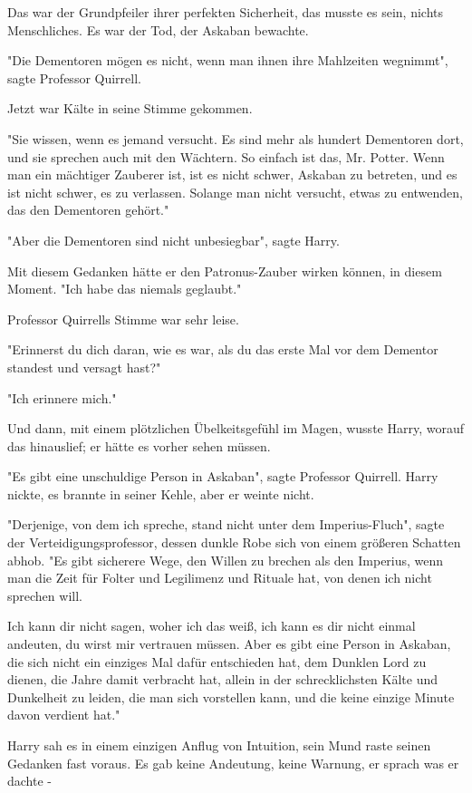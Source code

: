 {Das war der Grundpfeiler ihrer perfekten Sicherheit, das musste es sein, nichts Menschliches. Es war der Tod, der Askaban bewachte.

"Die Dementoren mögen es nicht, wenn man ihnen ihre Mahlzeiten wegnimmt", sagte Professor Quirrell.

Jetzt war Kälte in seine Stimme gekommen.

"Sie wissen, wenn es jemand versucht. Es sind mehr als hundert Dementoren dort, und sie sprechen auch mit den Wächtern. So einfach ist das, Mr. Potter. Wenn man ein mächtiger Zauberer ist, ist es nicht schwer, Askaban zu betreten, und es ist nicht schwer, es zu verlassen. Solange man nicht versucht, etwas zu entwenden, das den Dementoren gehört."

"Aber die Dementoren sind nicht unbesiegbar", sagte Harry.

Mit diesem Gedanken hätte er den Patronus-Zauber wirken können, in diesem Moment. "Ich habe das niemals geglaubt."

Professor Quirrells Stimme war sehr leise.

"Erinnerst du dich daran, wie es war, als du das erste Mal vor dem Dementor standest und versagt hast?"

"Ich erinnere mich."

Und dann, mit einem plötzlichen Übelkeitsgefühl im Magen, wusste Harry, worauf das hinauslief; er hätte es vorher sehen müssen.

"Es gibt eine unschuldige Person in Askaban", sagte Professor Quirrell. Harry nickte, es brannte in seiner Kehle, aber er weinte nicht.

"Derjenige, von dem ich spreche, stand nicht unter dem Imperius-Fluch", sagte der Verteidigungsprofessor, dessen dunkle Robe sich von einem größeren Schatten abhob. "Es gibt sicherere Wege, den Willen zu brechen als den Imperius, wenn man die Zeit für Folter und Legilimenz und Rituale hat, von denen ich nicht sprechen will.

Ich kann dir nicht sagen, woher ich das weiß, ich kann es dir nicht einmal andeuten, du wirst mir vertrauen müssen. Aber es gibt eine Person in Askaban, die sich nicht ein einziges Mal dafür entschieden hat, dem Dunklen Lord zu dienen, die Jahre damit verbracht hat, allein in der schrecklichsten Kälte und Dunkelheit zu leiden, die man sich vorstellen kann, und die keine einzige Minute davon verdient hat."

Harry sah es in einem einzigen Anflug von Intuition, sein Mund raste seinen Gedanken fast voraus. Es gab keine Andeutung, keine Warnung, er sprach was er dachte -

}
